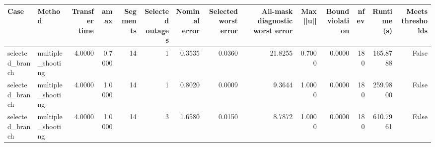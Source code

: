 \begin{tabular}{llrrrrrrrrrrrr}
\toprule
Case & Method & Transfer time & amax & Segments & Selected outages & Nominal error & Selected worst error & All-mask diagnostic worst error & Max ||u|| & Bound violation & nfev & Runtime (s) & Meets thresholds \\
\midrule
selected\_branch & multiple\_shooting & 4.0000 & 0.7000 & 14 & 1 & 0.3535 & 0.0360 & 21.8255 & 0.7000 & 0.0000 & 180 & 165.8788 & False \\
selected\_branch & multiple\_shooting & 4.0000 & 1.0000 & 14 & 1 & 0.8020 & 0.0009 & 9.3644 & 1.0000 & 0.0000 & 180 & 259.9800 & False \\
selected\_branch & multiple\_shooting & 4.0000 & 1.0000 & 14 & 3 & 1.6580 & 0.0150 & 8.7872 & 1.0000 & 0.0000 & 180 & 610.7961 & False \\
\bottomrule
\end{tabular}
